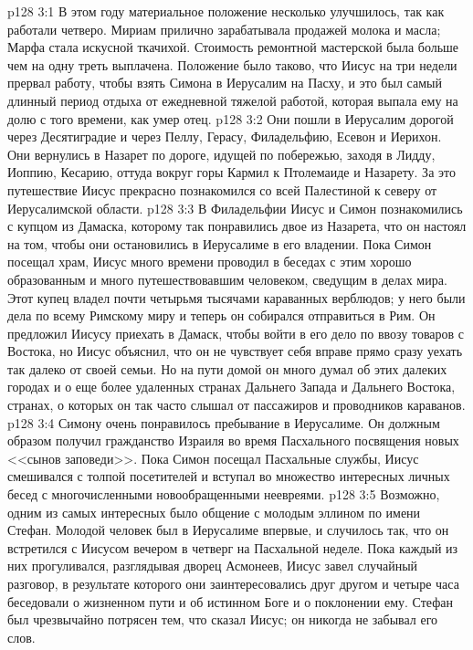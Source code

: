 \vs p128 3:1 В этом году материальное положение несколько улучшилось, так как работали четверо. Мириам прилично зарабатывала продажей молока и масла; Марфа стала искусной ткачихой. Стоимость ремонтной мастерской была больше чем на одну треть выплачена. Положение было таково, что Иисус на три недели прервал работу, чтобы взять Симона в Иерусалим на Пасху, и это был самый длинный период отдыха от ежедневной тяжелой работой, которая выпала ему на долю с того времени, как умер отец.
\vs p128 3:2 Они пошли в Иерусалим дорогой через Десятиградие и через Пеллу, Герасу, Филадельфию, Есевон и Иерихон. Они вернулись в Назарет по дороге, идущей по побережью, заходя в Лидду, Иоппию, Кесарию, оттуда вокруг горы Кармил к Птолемаиде и Назарету. За это путешествие Иисус прекрасно познакомился со всей Палестиной к северу от Иерусалимской области.
\vs p128 3:3 В Филадельфии Иисус и Симон познакомились с купцом из Дамаска, которому так понравились двое из Назарета, что он настоял на том, чтобы они остановились в Иерусалиме в его владении. Пока Симон посещал храм, Иисус много времени проводил в беседах с этим хорошо образованным и много путешествовавшим человеком, сведущим в делах мира. Этот купец владел почти четырьмя тысячами караванных верблюдов; у него были дела по всему Римскому миру и теперь он собирался отправиться в Рим. Он предложил Иисусу приехать в Дамаск, чтобы войти в его дело по ввозу товаров с Востока, но Иисус объяснил, что он не чувствует себя вправе прямо сразу уехать так далеко от своей семьи. Но на пути домой он много думал об этих далеких городах и о еще более удаленных странах Дальнего Запада и Дальнего Востока, странах, о которых он так часто слышал от пассажиров и проводников караванов.
\vs p128 3:4 Симону очень понравилось пребывание в Иерусалиме. Он должным образом получил гражданство Израиля во время Пасхального посвящения новых <<сынов заповеди>>. Пока Симон посещал Пасхальные службы, Иисус смешивался с толпой посетителей и вступал во множество интересных личных бесед с многочисленными новообращенными неевреями.
\vs p128 3:5 Возможно, одним из самых интересных было общение с молодым эллином по имени Стефан. Молодой человек был в Иерусалиме впервые, и случилось так, что он встретился с Иисусом вечером в четверг на Пасхальной неделе. Пока каждый из них прогуливался, разглядывая дворец Асмонеев, Иисус завел случайный разговор, в результате которого они заинтересовались друг другом и четыре часа беседовали о жизненном пути и об истинном Боге и о поклонении ему. Стефан был чрезвычайно потрясен тем, что сказал Иисус; он никогда не забывал его слов.
